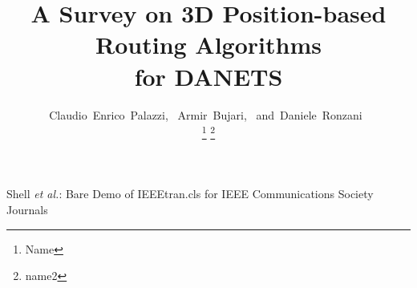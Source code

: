 \documentclass[journal,comsoc]{IEEEtran}
\begin{document}
%
\title{A Survey on 3D Position-based Routing Algorithms\\for DANETS }
%
%
%

\author{Claudio~Enrico~Palazzi,~
        Armir~Bujari,~\IEEEmembership{}
        and~Daniele~Ronzani~\IEEEmembership{}%

\thanks{Name} \thanks{name2}%
}

% 
%



%
{Shell \MakeLowercase{\textit{et al.}}: Bare Demo of IEEEtran.cls for IEEE Communications Society Journals}
% 
\end{document}
